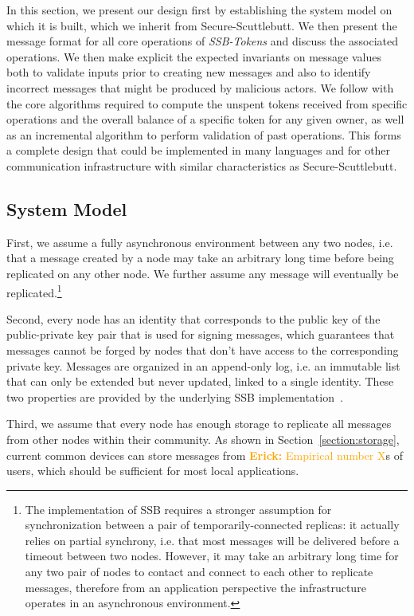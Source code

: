 \documentclass[sigplan,screen,10pt]{acmart}
\newcommand\el[1]{\textcolor{orange}{{\bf Erick: }#1}}
\newcommand\ssbtokens[0]{\textit{SSB-Tokens} }
\begin{document}
In this section, we present our design first by establishing the system model on which it is built, which we inherit from Secure-Scuttlebutt. We then present the message format for all core operations of \ssbtokens and discuss the associated operations. We then make explicit the expected invariants on message values both to validate inputs prior to creating new messages and also to identify incorrect messages that might be produced by malicious actors. We follow with the core algorithms required to compute the unspent tokens received from specific operations and the overall balance of a specific token for any given owner, as well as an incremental algorithm to perform validation of past operations. This forms a complete design that could be implemented in many languages and for other communication infrastructure with similar characteristics as Secure-Scuttlebutt.

\subsection{System Model}

First, we assume a fully asynchronous environment between any two nodes, i.e. that a message created by a node may take an arbitrary long time before being replicated on any other node. We further assume any message will eventually be replicated.\footnote{The implementation of SSB requires a stronger assumption for synchronization between a pair of temporarily-connected replicas: it actually relies on partial synchrony, i.e. that most messages will be delivered before a timeout between two nodes. However, it may take an arbitrary long time for any two pair of nodes to contact and connect to each other to replicate messages, therefore from an application perspective the infrastructure operates in an asynchronous environment.}

Second, every node has an identity that corresponds to the public key of the public-private key pair that is used for signing messages, which guarantees that messages cannot be forged by nodes that don't have access to the corresponding private key. Messages are organized in an append-only log, i.e. an immutable list that can only be extended but never updated, linked to a single identity. These two properties are provided by the underlying SSB implementation~\cite{kermarrec2020gossiping}.

Third, we assume that every node has enough storage to replicate all messages from other nodes within their community. As shown in Section~\ref{section:storage}, current common devices can store messages from \el{Empirical number X}s of users, which should be sufficient for most local applications.
\end{document}

